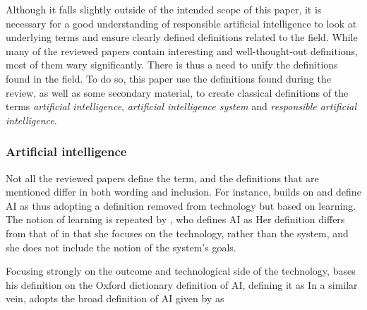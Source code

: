 \label{sec:Definitions}
Although it falls slightly outside of the intended scope of this paper, it is necessary for a good understanding of responsible artificial intelligence to look at underlying terms and ensure clearly defined definitions related to the field. While many of the reviewed papers contain interesting and well-thought-out definitions, most of them wary significantly. There is thus a need to unify the definitions found in the field. To do so, this paper use the definitions found during the review, as well as some secondary material, to create classical definitions \parencite[p. 36]{Seppälä_2014} of the terms \textit{artificial intelligence}, \textit{artificial intelligence system} and \textit{responsible artificial intelligence}.


\subsubsection{Artificial intelligence}
\label{sec:definition-ai}
Not all the reviewed papers define the term, and the definitions that are mentioned differ in both wording and inclusion. For instance,
\textcite[p. 258]{Mikalef_2022} builds on \textcite{Mikalef_2021_notreview} and define AI as  thus adopting a definition removed from technology but based on learning. The notion of learning is repeated by \textcite[p. 2]{Dignum_2021}, who defines AI as  Her definition differs from that of \citeauthor{Mikalef_2022} in that she focuses on the technology, rather than the system, and she does not include the notion of the system's goals.

Focusing strongly on the outcome and technological side of the technology, \textcite[p. 130-131]{Brand_2022} bases his definition on the Oxford dictionary definition of AI, defining it as  In a similar vein, \textcite[p. 1]{Havrda_2020} adopts the broad definition of AI given by \textcite{IEEE_vision} as 

